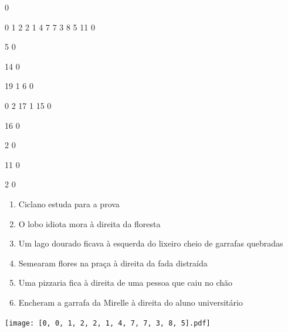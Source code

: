 \documentclass[12pt]{article}
\begin{document}
		\vfill  
		  
{
	0	%

	0	%
	1	%
	2	%
	2	%
	1	%
	4	%
	7	%
	7	%
	3	%
	8	%
	5	%
	11	%
	0	%

	5	%
	0	%

	14	%
	0	%

	19	%
	1	%
	6	%
	0	%

	0	%
	2	%
	17	%
	1	%
	15	%
	0	%

	16	%
	0	%

	2	%
	0	%

	11	%
	0	%

	2	%
	0	%

}	  
		    	

		 

\pagebreak


	\begin{enumerate}
		  \sffamily %
		  \large %


\vfill \item
Ciclano	%
estuda para a prova	%

\vfill \item
O lobo idiota mora	%
à direita
da floresta	%

\vfill \item
Um lago dourado ficava	%
à esquerda
do lixeiro cheio de garrafas quebradas	%

\vfill \item
Semearam flores na praça	%
à direita
da fada distraída	%

\vfill \item
Uma pizzaria fica	%
à direita
de uma pessoa que caiu no chão	%

\vfill \item
Encheram a garrafa da Mirelle	%
à direita
do aluno universitário	%
	\end{enumerate}
		  
		  \hfill

		  \vfill

\texttt{[image: [0, 0, 1, 2, 2, 1, 4, 7, 7, 3, 8, 5].pdf]}


	\hfill	  	  

\end{document}
